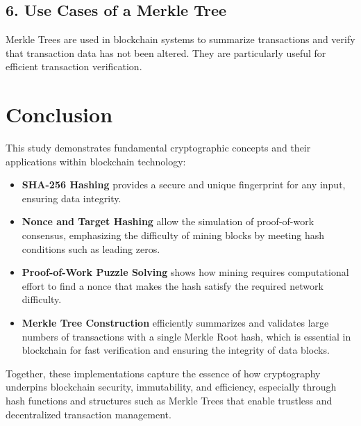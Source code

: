 \documentclass[12pt,a4paper]{article}
\begin{document}
\subsection{6. Use Cases of a Merkle Tree}
Merkle Trees are used in blockchain systems to summarize transactions and verify that transaction data has not been altered. They are particularly useful for efficient transaction verification.

\section{Conclusion}
This study demonstrates fundamental cryptographic concepts and their applications within blockchain technology:

\begin{itemize}
    \item \textbf{SHA-256 Hashing} provides a secure and unique fingerprint for any input, ensuring data integrity.
    \item \textbf{Nonce and Target Hashing} allow the simulation of proof-of-work consensus, emphasizing the difficulty of mining blocks by meeting hash conditions such as leading zeros.
    \item \textbf{Proof-of-Work Puzzle Solving} shows how mining requires computational effort to find a nonce that makes the hash satisfy the required network difficulty.
    \item \textbf{Merkle Tree Construction} efficiently summarizes and validates large numbers of transactions with a single Merkle Root hash, which is essential in blockchain for fast verification and ensuring the integrity of data blocks.
\end{itemize}

Together, these implementations capture the essence of how cryptography underpins blockchain security, immutability, and efficiency, especially through hash functions and structures such as Merkle Trees that enable trustless and decentralized transaction management.
\end{document}

